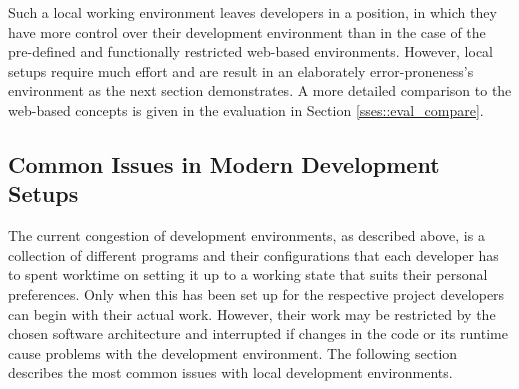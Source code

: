     Such a local working environment leaves developers in a position, in which they have more control over their development environment than in the case of the pre-defined and functionally restricted web-based environments.
    However, local setups require much effort and are result in an elaborately error-proneness's environment as the next section demonstrates. A more detailed comparison to the web-based concepts is given in the evaluation in Section \ref{sses::eval_compare}.

    \subsection{Common Issues in Modern Development Setups}
    The current congestion of development environments, as described above, is a collection of different programs and their configurations that each developer has to spent worktime on setting it up to a working state that suits their personal preferences. Only when this has been set up for the respective project developers can begin with their actual work. However, their work may be restricted by the chosen software architecture and interrupted if changes in the code or its runtime cause problems with the development environment. The following section describes the most common issues with local development environments.

